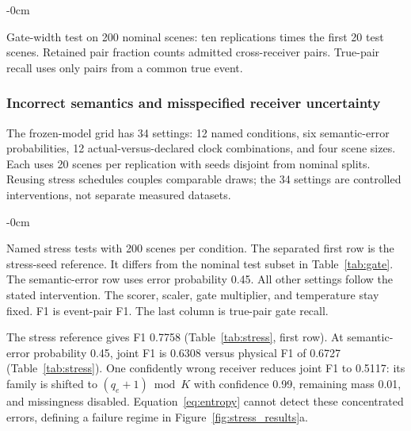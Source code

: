 \begin{table}[!t]\begin{adjustwidth}{-\extralength}{0cm}
\caption{Gate-width test on 200 nominal scenes: ten replications times the first 20 test scenes. Retained pair fraction counts admitted cross-receiver pairs. True-pair recall uses only pairs from a common true event.}\label{tab:gate}
\small\renewcommand{\arraystretch}{1.12}
\end{adjustwidth}\end{table}

\subsubsection{Incorrect semantics and misspecified receiver uncertainty}
The frozen-model grid has 34 settings: 12 named conditions, six semantic-error probabilities, 12 actual-versus-declared clock combinations, and four scene sizes. Each uses 20 scenes per replication with seeds disjoint from nominal splits. Reusing stress schedules couples comparable draws; the 34 settings are controlled interventions, not separate measured datasets.

\begin{table}[!t]\begin{adjustwidth}{-\extralength}{0cm}
\caption{Named stress tests with 200 scenes per condition. The separated first row is the stress-seed reference. It differs from the nominal test subset in Table~\ref{tab:gate}. The semantic-error row uses error probability 0.45. All other settings follow the stated intervention. The scorer, scaler, gate multiplier, and temperature stay fixed. F1 is event-pair F1. The last column is true-pair gate recall.}\label{tab:stress}
\small\renewcommand{\arraystretch}{1.12}
\end{adjustwidth}\end{table}


The stress reference gives F1 0.7758 (Table~\ref{tab:stress}, first row). At semantic-error probability 0.45, joint F1 is 0.6308 versus physical F1 of 0.6727 (Table~\ref{tab:stress}). One confidently wrong receiver reduces joint F1 to 0.5117: its family is shifted to $(q_e+1)\bmod K$ with confidence 0.99, remaining mass 0.01, and missingness disabled. Equation~\eqref{eq:entropy} cannot detect these concentrated errors, defining a failure regime in Figure~\ref{fig:stress_results}a.

